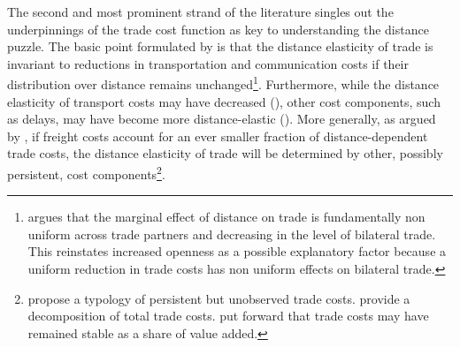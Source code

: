 \documentclass[12pt,twoside,a4paper,notitlepage]{article}
\begin{document}
The second and most prominent strand of the literature singles out the underpinnings of the trade cost function as key to understanding the distance puzzle. 
The basic point formulated by \cite{Buch2004} is that the distance elasticity of trade is invariant to reductions in transportation and communication costs if their distribution over distance remains unchanged\footnote{\cite{Egger2008} argues that the marginal effect of distance on trade is fundamentally non uniform across trade partners and decreasing in the level of bilateral trade. This reinstates increased openness as a possible explanatory factor because a uniform reduction in trade costs has non uniform effects on bilateral trade.}. Furthermore, while the distance elasticity of transport costs may have decreased (\cite{Hummels2007}), other cost components, such as delays, may have become more distance-elastic (\cite{Hummels2013}). More generally, as argued by \cite{Head2013}, if freight costs account for an ever smaller fraction of distance-dependent trade costs, the distance elasticity of trade will be determined by other, possibly persistent, cost components\footnote{\cite{Head2013} propose a typology of persistent but unobserved trade costs. \cite{AndersonWincoop2004} provide a decomposition of total trade costs. \fi \cite{Daudin2003, Daudin2005} put forward that trade costs may have remained stable as a share of value added.}.
\end{document}
